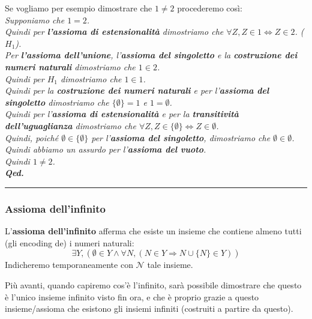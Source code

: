 \documentclass[
  a4paper,
]{article}
\begin{document}
\begin{examplebox}

Se vogliamo per esempio dimostrare che \(1 \not = 2\) procederemo
così:\\
\emph{Supponiamo che \(1 = 2\).}\\
\emph{Quindi per \textbf{l'assioma di estensionalità} dimostriamo che
\(\forall Z, Z \in 1 \iff Z \in 2\). (\(H_1\)).}\\
\emph{Per \textbf{l'assioma dell'unione}, l'\textbf{assioma del
singoletto} e la \textbf{costruzione dei numeri naturali} dimostriamo
che \(1 \in 2\).}\\
\emph{Quindi per \(H_1\) dimostriamo che \(1\in1\).}\\
\emph{Quindi per la \textbf{costruzione dei numeri naturali} e per
l'\textbf{assioma del singoletto} dimostriamo che \(\{\emptyset\} = 1\)
e \(1 = \emptyset\).}\\
\emph{Quindi per l'\textbf{assioma di estensionalità} e per la
\textbf{transitività dell'uguaglianza} dimostriamo che
\(\forall Z, Z \in \{\emptyset\} \iff Z \in \emptyset\).}\\
\emph{Quindi, poiché \(\emptyset \in \{\emptyset\}\) per
l'\textbf{assioma del singoletto}, dimostriamo che
\(\emptyset \in \emptyset\).}\\
\emph{Quindi abbiamo un assurdo per l'\textbf{assioma del vuoto}.}\\
\emph{Quindi \(1\not = 2\).}\\
\textbf{\emph{Qed.}}

\end{examplebox}

\par\noindent\rule{\linewidth}{0.4pt}\par\vspace{6pt}

\hypertarget{assioma-dellinfinito}{%
\subsubsection{Assioma dell'infinito}\label{assioma-dellinfinito}}

L'\textbf{assioma dell'infinito} afferma che esiste un insieme che
contiene almeno tutti (gli encoding de) i numeri naturali: \[
\exists Y, (\emptyset \in Y \land \forall N, (N \in Y \Rightarrow N \cup \{N\} \in Y))
\] Indicheremo temporaneamente con \(\mathcal{N}\) tale insieme.

Più avanti, quando capiremo cos'è l'infinito, sarà possibile dimostrare
che questo è l'unico insieme infinito visto fin ora, e che è proprio
grazie a questo insieme/assioma che esistono gli insiemi infiniti
(costruiti a partire da questo).
\end{document}
